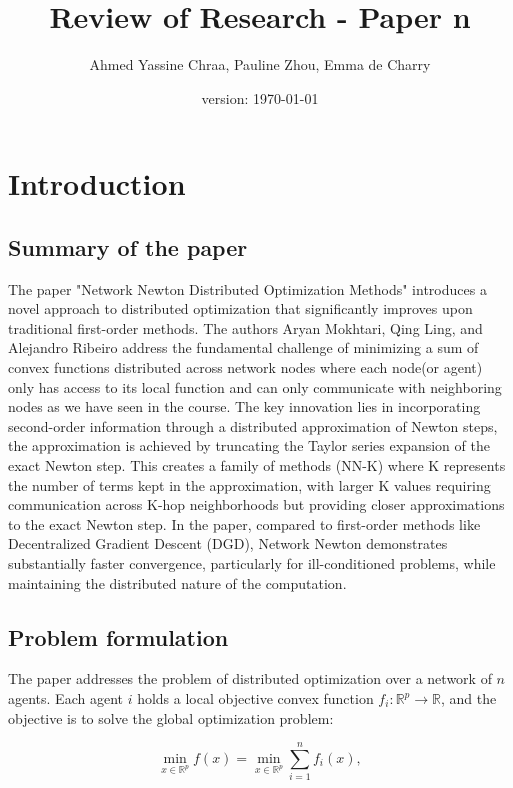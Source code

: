 \documentclass[10pt,english]{article}
\title{Review of Research - Paper n\°5}
\date{version: \today}%
\author{Ahmed Yassine Chraa, Pauline Zhou, Emma de Charry}
\begin{document}
\maketitle

\section{Introduction}

\subsection{Summary of the paper}

The paper "Network Newton Distributed Optimization Methods" introduces a novel approach to distributed optimization that significantly improves upon traditional first-order methods. The authors Aryan Mokhtari, Qing Ling, and Alejandro Ribeiro address the fundamental challenge of minimizing a sum of convex functions distributed across network nodes where each node(or agent) only has access to its local function and can only communicate with neighboring nodes as we have seen in the course. The key innovation lies in incorporating second-order information through a distributed approximation of Newton steps, the approximation is achieved by truncating the Taylor series expansion of the exact Newton step. This creates a family of methods (NN-K) where K represents the number of terms kept in the approximation, with larger K values requiring communication across K-hop neighborhoods but providing closer approximations to the exact Newton step. In the paper, compared to first-order methods like Decentralized Gradient Descent (DGD), Network Newton demonstrates substantially faster convergence, particularly for ill-conditioned problems, while maintaining the distributed nature of the computation.

\subsection{Problem formulation}

The paper addresses the problem of distributed optimization over a network of \( n \) agents. Each agent \( i \) holds a local objective convex function \( f_i: \mathbb{R}^p \to \mathbb{R} \), and the objective is to solve the global optimization problem:

\begin{equation}
\min_{x \in \mathbb{R}^p} f(x) = \min_{x \in \mathbb{R}^p}\sum_{i=1}^{n} f_i(x),
\end{equation}
\end{document}
